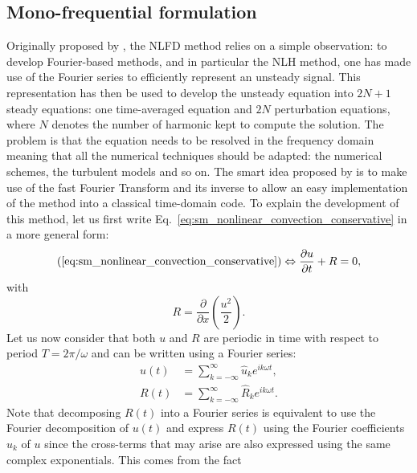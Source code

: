 
\subsection{Mono-frequential formulation}

Originally proposed by \citet{McMullen2001}, the NLFD
method relies on a simple observation: to develop Fourier-based methods, and in
particular the NLH method, one has made use of the Fourier
series to efficiently represent an unsteady signal.
This representation has then be used to develop the unsteady
equation into $2N+1$ steady equations: one time-averaged equation
and $2N$ perturbation equations, 
where $N$ denotes the number
of harmonic kept to compute the solution.
The problem is that the equation needs to be 
resolved in the frequency domain meaning
that all the numerical techniques should be adapted: the numerical schemes,
the turbulent models and so on. The smart idea 
proposed by \citet{McMullen2001} is to
make use of the fast Fourier Transform and its inverse to
allow an easy implementation of the method into a classical time-domain code.
To explain the development of this method, let us first 
write Eq.~\eqref{eq:sm_nonlinear_convection_conservative} 
in a more general form:
\begin{equation}
	(\ref{eq:sm_nonlinear_convection_conservative})
	\Leftrightarrow
	\frac{\partial u}{\partial t} + R = 0,
	\label{eq:sm_nonlinear_convection_residual}
\end{equation}
with
\begin{equation}
	R = \frac{\partial}{\partial x} \left( 
	\frac{u^2}{2} \right).
\end{equation}
Let us now consider that both $u$ and $R$ are periodic
in time with respect to period $T = 2 \pi / \omega$
and can be written using a Fourier series:
\begin{equation}
	\begin{split}
		u(t) &= \sum_{k=-\infty}^{\infty} \widehat{u}_k e^{i k \omega t}, \\
		R(t) &= \sum_{k=-\infty}^{\infty} \widehat{R}_k e^{i k \omega t}.
	\end{split}
\end{equation}
Note that decomposing $R(t)$ into a Fourier series is equivalent
to use the Fourier decomposition of $u(t)$ and express
$R(t)$ using the Fourier coefficients $\widehat{u}_k$ of $u$
since the cross-terms that may arise are also expressed 
using the same complex exponentials. This comes from the fact
